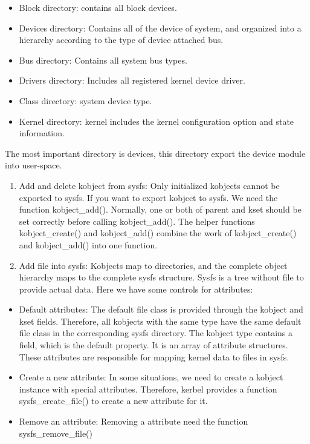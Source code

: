 \documentclass[10pt,draftclsnofoot,journal,compsoc,onecolumn]{IEEEtran}
\begin{document}
	\begin{itemize}
		\item Block directory: contains all block devices.
		\item Devices directory: Contains all of the device of system, and organized into a hierarchy according to the type of device attached bus. 
		\item Bus directory: Contains all system bus types.
		\item Drivers directory: Includes all registered kernel device driver.
		\item Class directory: system device type.
		\item Kernel directory: kernel includes the kernel configuration option and state information.
	\end{itemize}
	
	The most important directory is devices, this directory export the device module into user-space. 
	
	\begin{enumerate}
		\item Add and delete kobject from sysfs: Only initialized kobjects cannot be exported to sysfs. If you want to export kobject to sysfs. We need the function kobject\_add(). Normally, one or both of parent and kset should be set correctly before calling kobject\_add(). The helper functions kobject\_create() and kobject\_add() combine the work of kobject\_create() and kobject\_add() into one function.
		\item Add file into sysfs: Kobjects map to directories, and the complete object hierarchy maps to the complete sysfs structure. Sysfs is a tree without file to provide actual data. Here we have some controls for attributes\cite{4}:
	\end{enumerate}
	
	\begin{itemize}
		\item Default attributes: The default file class is provided through the kobject and kset fields. Therefore, all kobjects with the same type have the same default file class in the corresponding sysfs directory. The kobject type contains a field, which is the default property. It is an array of attribute structures. These attributes are responsible for mapping kernel data to files in sysfs.
		\item Create a new attribute: In some situations, we need to create a kobject instance with special attributes. Therefore, kerbel provides a function sysfs\_create\_file() to create a new attribute for it.
		\item Remove an attribute: Removing a attribute need the function sysfs\_remove\_file()
	\end{itemize}
\end{document}
